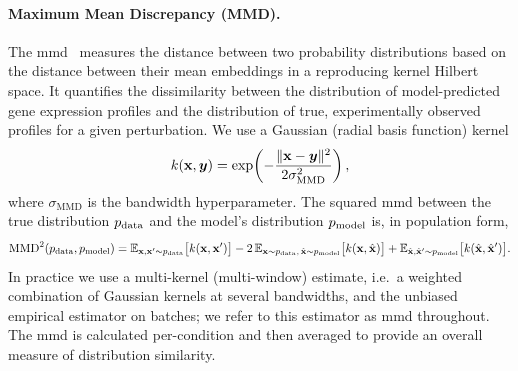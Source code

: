 \documentclass[10pt,letterpaper]{article}
\def\vy{{\bm{y}}}\def\vz{{\bm{z}}}
\newcommand{\pdata}{p_{\rm{data}}}
\newcommand{\pmodel}{p_{\rm{model}}}
\newcommand{\E}{\mathbb{E}}
\theoremstyle{definition}
\theoremstyle{remark}
\newcommand{\variables}{\rvx}
\newcommand{\mmdsigmaMMD}{\sigma_{\text{MMD}}}
\newcommand{\predictedvariable}{\hat{\variables}}
\newcommand{\kernel}{k}
\newcommand{\mmd}{\operatorname{MMD}}
\begin{document}
\paragraph{Maximum Mean Discrepancy (MMD).}
The \gls{mmd}~\cite{gretton2012kernel} measures the distance between two probability distributions based on the distance between their mean embeddings in a reproducing kernel Hilbert space.
It quantifies the dissimilarity between the distribution of model-predicted gene expression profiles and the distribution of true, experimentally observed profiles for a given perturbation.
We use a Gaussian (radial basis function) kernel
\begin{equation}
    \kernel(\variables, \vy) = \exp\!\left( -\frac{\|\variables - \vy\|^2}{2\mmdsigmaMMD^2} \right),
    \label{eq:metrics:kernel}
\end{equation}
where $\mmdsigmaMMD$ is the bandwidth hyperparameter.
The squared \gls{mmd} between the true distribution $\pdata$ and the model's distribution $\pmodel$ is, in population form,
\begin{equation}
    \mmd^2(\pdata, \pmodel) = \E_{\variables, \variables' \sim \pdata}\bigl[\kernel(\variables, \variables')\bigr]
    - 2\,\E_{\variables \sim \pdata,\, \predictedvariable \sim \pmodel}\bigl[\kernel(\variables, \predictedvariable)\bigr]
    + \E_{\predictedvariable, \predictedvariable' \sim \pmodel}\bigl[\kernel(\predictedvariable, \predictedvariable')\bigr].
    \label{eq:metrics:mmd}
\end{equation}
In practice we use a multi-kernel (multi-window) estimate, i.e.\ a weighted combination of Gaussian kernels at several bandwidths, and the unbiased empirical estimator on batches; we refer to this estimator as \gls{mmd} throughout.
The \gls{mmd} is calculated per-condition and then averaged to provide an overall measure of distribution similarity.
\end{document}
